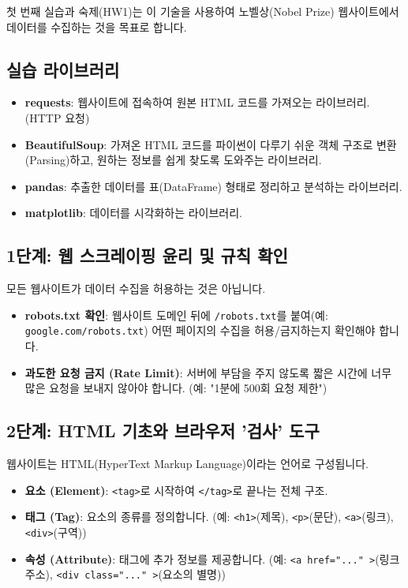 \documentclass[11pt,a4paper]{book}
\theoremstyle{definition}
\begin{document}
첫 번째 실습과 숙제(HW1)는 이 기술을 사용하여 노벨상(Nobel Prize) 웹사이트에서 데이터를 수집하는 것을 목표로 합니다.

\subsection{실습 라이브러리}
\begin{itemize}
    \item \textbf{requests}: 웹사이트에 접속하여 원본 HTML 코드를 가져오는 라이브러리. (HTTP 요청)
    \item \textbf{BeautifulSoup}: 가져온 HTML 코드를 파이썬이 다루기 쉬운 객체 구조로 변환(Parsing)하고, 원하는 정보를 쉽게 찾도록 도와주는 라이브러리.
    \item \textbf{pandas}: 추출한 데이터를 표(DataFrame) 형태로 정리하고 분석하는 라이브러리.
    \item \textbf{matplotlib}: 데이터를 시각화하는 라이브러리.
\end{itemize}

\subsection{1단계: 웹 스크레이핑 윤리 및 규칙 확인}
\begin{warningbox}
모든 웹사이트가 데이터 수집을 허용하는 것은 아닙니다.

\begin{itemize}
    \item \textbf{robots.txt 확인}: 웹사이트 도메인 뒤에 \texttt{/robots.txt}를 붙여(예: \texttt{google.com/robots.txt}) 어떤 페이지의 수집을 허용/금지하는지 확인해야 합니다.
    \item \textbf{과도한 요청 금지 (Rate Limit)}: 서버에 부담을 주지 않도록 짧은 시간에 너무 많은 요청을 보내지 않아야 합니다. (예: "1분에 500회 요청 제한")
\end{itemize}
\end{warningbox}

\subsection{2단계: HTML 기초와 브라우저 '검사' 도구}
웹사이트는 HTML(HyperText Markup Language)이라는 언어로 구성됩니다.

\begin{itemize}
    \item \textbf{요소 (Element)}: \texttt{<tag>}로 시작하여 \texttt{</tag>}로 끝나는 전체 구조.
    \item \textbf{태그 (Tag)}: 요소의 종류를 정의합니다. (예: \texttt{<h1>}(제목), \texttt{<p>}(문단), \texttt{<a>}(링크), \texttt{<div>}(구역))
    \item \textbf{속성 (Attribute)}: 태그에 추가 정보를 제공합니다. (예: \texttt{<a href="..." >}(링크 주소), \texttt{<div class="..." >}(요소의 별명))
\end{itemize}
\end{document}
